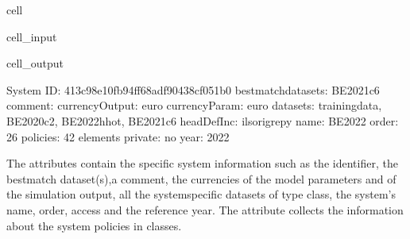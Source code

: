 \documentclass[letterpaper,10pt,english]{sphinxmanual}
\begin{document}
\begin{sphinxuseclass}{cell}
\begin{sphinxuseclass}{cell_input}
\begin{sphinxVerbatim}[commandchars=\\\{\}]
\PYG{p}{[}\PYG{p}{]}\PYG{p}{[}\PYG{p}{]}
\PYG{p}{[}\PYG{p}{]}\PYG{p}{[}\PYG{p}{]}
\PYG{p}{[}\PYG{p}{]}\PYG{p}{[}\PYG{p}{]}
\PYG{p}{[}\PYG{p}{]}\PYG{p}{[}\PYG{p}{]}
\end{sphinxVerbatim}

\end{sphinxuseclass}
\begin{sphinxuseclass}{cell_output}
\begin{sphinxVerbatim}[commandchars=\\\{\}]
\PYGZhy{}\PYGZhy{}\PYGZhy{}\PYGZhy{}\PYGZhy{}\PYGZhy{}\PYGZhy{}\PYGZhy{}\PYGZhy{}\PYGZhy{}\PYGZhy{}\PYGZhy{}\PYGZhy{}\PYGZhy{}\PYGZhy{}\PYGZhy{}\PYGZhy{}\PYGZhy{}\PYGZhy{}\PYGZhy{}\PYGZhy{}\PYGZhy{}\PYGZhy{}\PYGZhy{}\PYGZhy{}\PYGZhy{}\PYGZhy{}\PYGZhy{}\PYGZhy{}\PYGZhy{}
System
\PYGZhy{}\PYGZhy{}\PYGZhy{}\PYGZhy{}\PYGZhy{}\PYGZhy{}\PYGZhy{}\PYGZhy{}\PYGZhy{}\PYGZhy{}\PYGZhy{}\PYGZhy{}\PYGZhy{}\PYGZhy{}\PYGZhy{}\PYGZhy{}\PYGZhy{}\PYGZhy{}\PYGZhy{}\PYGZhy{}\PYGZhy{}\PYGZhy{}\PYGZhy{}\PYGZhy{}\PYGZhy{}\PYGZhy{}\PYGZhy{}\PYGZhy{}\PYGZhy{}\PYGZhy{}
	 ID: \PYGZsq{}413c98e1\PYGZhy{}0fb9\PYGZhy{}4ff6\PYGZhy{}8adf\PYGZhy{}90438cf051b0\PYGZsq{}
	 bestmatch\PYGZus{}datasets: BE\PYGZus{}2021\PYGZus{}c6
	 comment: \PYGZsq{}\PYGZsq{}
	 currencyOutput: \PYGZsq{}euro\PYGZsq{}
	 currencyParam: \PYGZsq{}euro\PYGZsq{}
	 datasets: training\PYGZus{}data, BE\PYGZus{}2020\PYGZus{}c2, BE\PYGZus{}2022\PYGZus{}hhot, BE\PYGZus{}2021\PYGZus{}c6
	 headDefInc: \PYGZsq{}ils\PYGZus{}origrepy\PYGZsq{}
	 name: \PYGZsq{}BE\PYGZus{}2022\PYGZsq{}
	 order: \PYGZsq{}26\PYGZsq{}
	 policies: 42 elements
	 private: \PYGZsq{}no\PYGZsq{}
	 year: \PYGZsq{}2022\PYGZsq{}
\end{sphinxVerbatim}

\end{sphinxuseclass}
\end{sphinxuseclass}
\sphinxAtStartPar
The  attributes contain the specific system information such as the identifier, the best\sphinxhyphen{}match dataset(s),a comment, the currencies of the model parameters and of the simulation output, all the system\sphinxhyphen{}specific datasets of type  class,  the system’s name, order, access and the reference year. The  attribute collects the information about the system policies in  classes.
\end{document}
